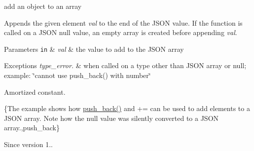 add an object to an array 

Appends the given element {\itshape val} to the end of the J\+S\+ON value. If the function is called on a J\+S\+ON null value, an empty array is created before appending {\itshape val}.


\begin{DoxyParams}[1]{Parameters}
\mbox{\tt in}  & {\em val} & the value to add to the J\+S\+ON array\\
\hline
\end{DoxyParams}

\begin{DoxyExceptions}{Exceptions}
{\em type\+\_\+error.} & when called on a type other than J\+S\+ON array or null; example\+: {\ttfamily \char`\"{}cannot use push\+\_\+back() with number\char`\"{}}\\
\hline
\end{DoxyExceptions}
Amortized constant.

\{The example shows how {\ttfamily \hyperlink{classnlohmann_1_1basic__json_ac8e523ddc8c2dd7e5d2daf0d49a9c0d7}{push\+\_\+back()}} and {\ttfamily +=} can be used to add elements to a J\+S\+ON array. Note how the {\ttfamily null} value was silently converted to a J\+S\+ON array.,push\+\_\+back\}

\begin{DoxySince}{Since}
version 1.. 
\end{DoxySince}
